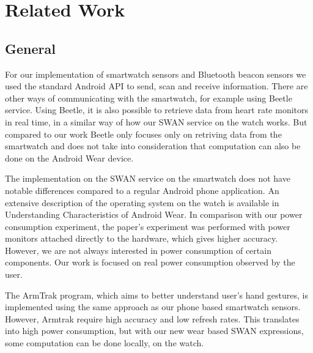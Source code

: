 
\chapter{Related Work} %

\label{Chapter2} %



\section{General}
For our implementation of smartwatch sensors and Bluetooth beacon sensors we used the standard Android API to send, scan and receive information.
There are other ways of communicating with the smartwatch, for example using Beetle\cite{beetle_mobisys16} service.
Using Beetle, it is also possible to retrieve data from heart rate monitors in real time, in a similar way of how our SWAN service on the watch works.
But compared to our work Beetle only focuses only on retriving data from the smartwatch and does not take into consideration that computation
can also be done on the Android Wear device.

The implementation on the SWAN service on the smartwatch does not have notable differences compared to a regular Android phone application.
An extensive description of the operating system on the watch is available  in Understanding Characteristics of Android Wear\cite{android_wear_char}.
In comparison with our power consumption experiment, the paper's experiment was performed  with power monitors attached 
directly to the hardware, which gives higher accuracy. However, we are not always interested in power consumption of certain components. Our work is focused on real
power consumption observed by the user.

The ArmTrak\cite{arm_trak} program, which aims to better understand user's hand gestures, is implemented using the same approach as our phone based 
smartwatch sensors. However, Armtrak require high accuracy and low refresh rates. This translates into high power consumption, but with our new wear based SWAN expressions, some computation can be
done locally, on the watch. 

